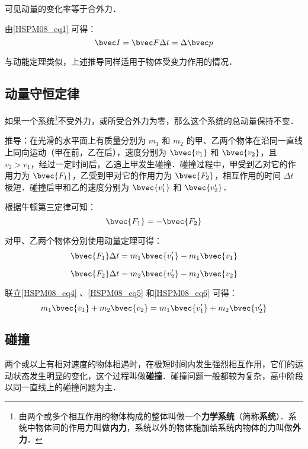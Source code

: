 可见动量的变化率等于合外力．

由\autoref{HSPM08_eq1} 可得：
\begin{equation}\label{HSPM08_eq3}
\bvec I=\bvec F\Delta t=\Delta \bvec p
\end{equation}

与动能定理类似，上述推导同样适用于物体受变力作用的情况．

\subsection{动量守恒定律}

如果一个系统\footnote{由两个或多个相互作用的物体构成的整体叫做一个\textbf{力学系统}（简称\textbf{系统}）．系统中物体间的作用力叫做\textbf{内力}，系统以外的物体施加给系统内物体的力叫做\textbf{外力}．}不受外力，或所受合外力为零，那么这个系统的总动量保持不变．

推导：在光滑的水平面上有质量分别为 $m_1$ 和 $m_2$ 的甲、乙两个物体在沿同一直线上同向运动（甲在前，乙在后），速度分别为 $\bvec{v_1}$ 和 $\bvec{v_2}$，且 $v_2>v_1$，经过一定时间后，乙追上甲发生碰撞．碰撞过程中，甲受到乙对它的作用力为 $\bvec {F_1}$，乙受到甲对它的作用力为 $\bvec {F_2}$，相互作用的时间 $\Delta t$ 极短．碰撞后甲和乙的速度分别为 $\bvec{v_1'}$ 和 $\bvec{v_2'}$．

根据牛顿第三定律可知：
\begin{equation}\label{HSPM08_eq4}
\bvec {F_1}=-\bvec{F_2}
\end{equation}

对甲、乙两个物体分别使用动量定理可得：
\begin{equation}\label{HSPM08_eq5}
\bvec{F_1}\Delta t=m_1\bvec{v_1'}-m_1\bvec{v_1}
\end{equation}

\begin{equation}\label{HSPM08_eq6}
\bvec{F_2}\Delta t=m_2\bvec{v_2'}-m_2\bvec{v_2}
\end{equation}

联立\autoref{HSPM08_eq4} 、\autoref{HSPM08_eq5} 和\autoref{HSPM08_eq6} 可得：
\begin{equation}
m_1\bvec{v_1}+ m_2\bvec{v_2}= m_1\bvec{v_1'}+ m_2\bvec{v_2'}
\end{equation}


\subsection{碰撞}

两个或以上有相对速度的物体相遇时，在极短时间内发生强烈相互作用，它们的运动状态发生明显的变化，这个过程叫做\textbf{碰撞}．碰撞问题一般都较为复杂，高中阶段以同一直线上的碰撞问题为主．


